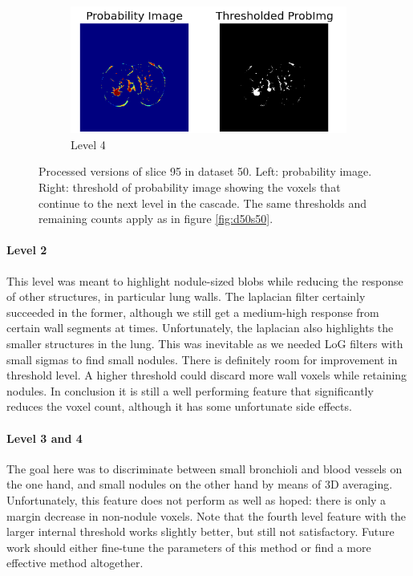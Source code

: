 \begin{figure}[p]
\begin{center}
\begin{subfigure}[b]{\linewidth}
		\includegraphics[width=\linewidth]{img/cascades/D50S95L4.png}
		\caption{Level 4}
	\end{subfigure}
  \caption{Processed versions of slice 95 in dataset 50. Left: probability
  image. Right: threshold of probability image showing the voxels that continue
  to the next level in the cascade. The same thresholds and remaining counts
  apply as in figure \ref{fig:d50s50}.}
  \label{fig:d50s95}
\end{center}
\end{figure}

\paragraph{Level 2}
This level was meant to highlight nodule-sized blobs while reducing the response
of other structures, in particular lung walls. The laplacian filter certainly
succeeded in the former, although we still get a medium-high response from
certain wall segments at times. Unfortunately, the laplacian also highlights the
smaller structures in the lung. This was inevitable as we needed LoG filters
with small sigmas to find small nodules. There is definitely room for
improvement in threshold level. A higher threshold could discard more wall
voxels while retaining nodules. In conclusion it is still a well performing
feature that significantly reduces the voxel count, although it has some
unfortunate side effects.

\paragraph{Level 3 and 4}
The goal here was to discriminate between small bronchioli and blood vessels on
the one hand, and small nodules on the other hand by means of 3D averaging.
Unfortunately, this feature does not perform as well as hoped: there is only a
margin decrease in non-nodule voxels. Note that the fourth level feature with
the larger internal threshold works slightly better, but still not satisfactory.
Future work should either fine-tune the parameters of this method or find a more
effective method altogether.

